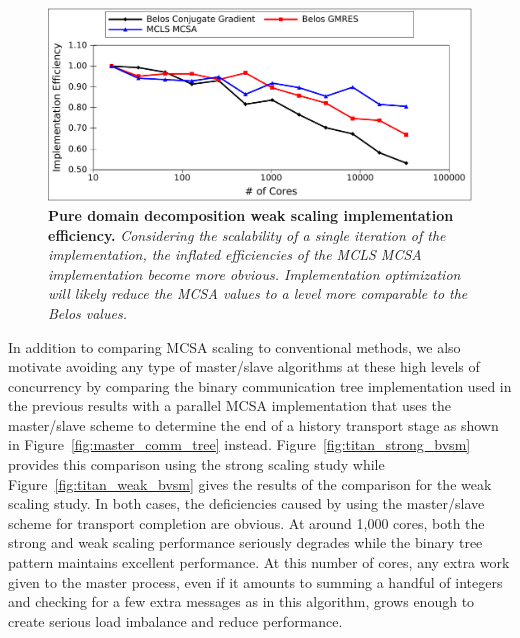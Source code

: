 \begin{figure}[t!]
  \begin{center}
    \includegraphics[width=6in]{chapters/parallel_mc/titan_weak_implementation.pdf}
  \end{center}
  \caption{\textbf{Pure domain decomposition weak scaling
      implementation efficiency.} \textit{Considering the scalability
      of a single iteration of the implementation, the inflated
      efficiencies of the MCLS MCSA implementation become more
      obvious. Implementation optimization will likely reduce the MCSA
      values to a level more comparable to the Belos values.}}
  \label{fig:titan_weak_implementation}
\end{figure}

In addition to comparing MCSA scaling to conventional methods, we also
motivate avoiding any type of master/slave algorithms at these high
levels of concurrency by comparing the binary communication tree
implementation used in the previous results with a parallel MCSA
implementation that uses the master/slave scheme to determine the end
of a history transport stage as shown in
Figure~\ref{fig:master_comm_tree}
instead. Figure~\ref{fig:titan_strong_bvsm} provides this comparison
using the strong scaling study while Figure~\ref{fig:titan_weak_bvsm}
gives the results of the comparison for the weak scaling study. In
both cases, the deficiencies caused by using the master/slave scheme
for transport completion are obvious. At around 1,000 cores, both the
strong and weak scaling performance seriously degrades while the
binary tree pattern maintains excellent performance. At this number of
cores, any extra work given to the master process, even if it amounts
to summing a handful of integers and checking for a few extra messages
as in this algorithm, grows enough to create serious load imbalance
and reduce performance.

